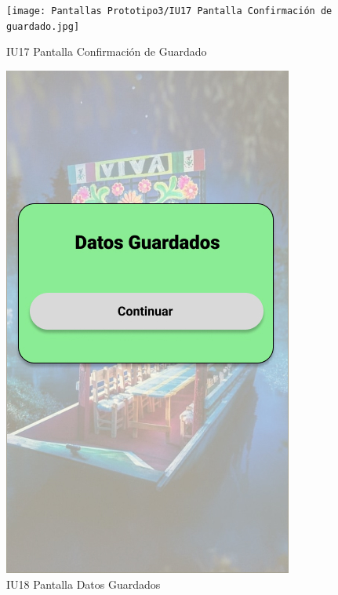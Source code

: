 \begin{figure}[h]
    \begin{minipage}{0.5\textwidth}
        \centering
        \texttt{[image: Pantallas Prototipo3/IU17 Pantalla Confirmación de guardado.jpg]}
        \caption{IU17 Pantalla Confirmación de Guardado}
    \end{minipage}
    
    \begin{minipage}{0.5\textwidth}
        \centering
        \includegraphics[width=.7\linewidth]{Pantallas Prototipo3/IU18 Pantalla Datos Guardados.jpg}
        \caption{IU18 Pantalla Datos Guardados}
    \end{minipage}%
\end{figure}

